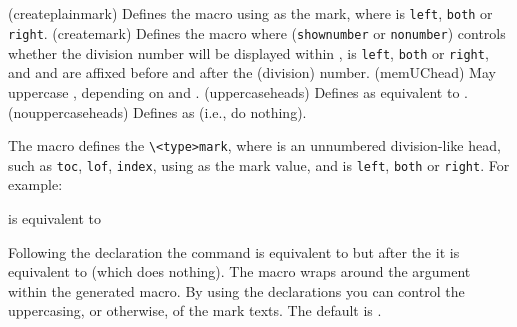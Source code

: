 \begin{plainlist}
\begin{syntax}
\cmd{\createplainmark} \\
\cmd{\memUChead} \\
\cmd{\uppercaseheads} \cmd{\nouppercaseheads} \\
\cmd{\createmark} \\
\end{syntax}
\glossary(createplainmark)%
  {}%
  {Defines the  macro using  as the mark, where
   is \texttt{left}, \texttt{both} or \texttt{right}.}
\glossary(createmark)%
  {}%
  {Defines the  macro where  (\texttt{shownumber} 
   or \texttt{nonumber}) controls whether the division number will be
   displayed within ,  is \texttt{left}, 
   \texttt{both} or \texttt{right}, and  and 
   are affixed before and after the  (division) number.}
\glossary(memUChead)%
  {}%
  {May uppercase , depending on  and
  .}
\glossary(uppercaseheads)%
  {}%
  {Defines  as equivalent to .}
\glossary(nouppercaseheads)%
  {}%
  {Defines  as  (i.e., do nothing).}


The macro \cmd{\createplainmark} defines the \verb?\<type>mark?, where 
 is an unnumbered division-like head, such as \texttt{toc},
\texttt{lof}, \texttt{index}, using  as the mark value, and 
 is \texttt{left}, \texttt{both} or \texttt{right}. For example:
\begin{lcode}
\end{lcode}
is equivalent to
\begin{lcode}
\def\tocmark{\markboth{\memUChead{\contentsname}}{}}
\def\lotmark{\markright{\memUChead{\listtablename}}}
\def\lofmark{\markboth{\memUChead{\bibname}}{\memUChead{\bibname}}}
\end{lcode}

    Following the declaration \cmd{\uppercaseheads} the \cmd{\memUChead} 
command is equivalent to \cmd{\MakeUppercase} but after the 
\cmd{\nouppercaseheads} it is equivalent to \cmd{\relax} (which does nothing).
The \cmd{\createplainmark} macro wraps \cmd{\memUChead} around the 
argument within the generated  macro. By using the
 declarations you can control the uppercasing, or
otherwise, of the mark texts. The default is \cmd{\uppercaseheads}.


\end{plainlist}

